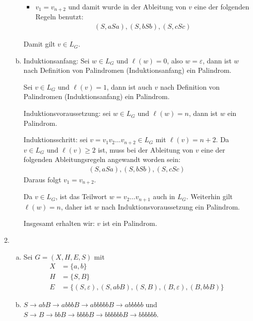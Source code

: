 \begin{enumerate}[1.]
\begin{enumerate}[(a)]
\begin{itemize}
          \item $v_1 = v_{n+2}$ und damit wurde in der Ableitung von $v$ eine
            der folgenden Regeln benutzt:
            \begin{align*}
              (S, aSa), (S, bSb), (S, cSc)
            \end{align*}
        \end{itemize}
        Damit gilt $v \in L_G$.

      \item Induktionsanfang: Sei $w \in L_G$ und $\ell(w) = 0$, also $w =
        \varepsilon$, dann ist $w$ nach Definition von Palindromen
        (Induktionsanfang) ein Palindrom.

        Sei $v \in L_G$ und $\ell(v) = 1$, dann ist auch $v$ nach Definition von
        Palindromen (Induktionsanfang) ein Palindrom.

        Induktionsvoraussetzung: sei $w \in L_G$ und $\ell(w) = n$, dann ist $w$
        ein Palindrom.

        Induktionsschritt: sei $v = v_1 v_2 \ldots v_{n+2} \in L_G$ mit $\ell(v)
        = n+2$. Da $v \in L_G$ und $\ell(v) \geq 2$ ist, muss bei der Ableitung
        von $v$ eine der folgenden Ableitungsregeln angewandt worden sein:
        \begin{align*}
          (S, aSa), (S, bSb), (S, cSc)
        \end{align*}
        Daraus folgt $v_1 = v_{n+2}$.

        Da $v \in L_G$, ist das Teilwort $w = v_2 \ldots v_{n+1}$ auch in $L_G$.
        Weiterhin gilt $\ell(w) = n$, daher ist $w$ nach Induktionsvoraussetzung
        ein Palindrom.

        Insgesamt erhalten wir: $v$ ist ein Palindrom.
    \end{enumerate}

  \item
    \begin{enumerate}[(a)]
      \item Sei $G = (X, H, E, S)$ mit
        \begin{align*}
          X & = \{a, b\}\\
          H & = \{S, B\}\\
          E & = \{(S, \varepsilon), (S, abB), (S, B), (B, \varepsilon), (B, bbB)\}
        \end{align*}

      \item $S \rightarrow abB \rightarrow abbbB \rightarrow abbbbbB \rightarrow
        abbbbb$ und $S \rightarrow B \rightarrow bbB \rightarrow bbbbB
        \rightarrow bbbbbbB \rightarrow bbbbbb$.


\end{enumerate}
\end{enumerate}
